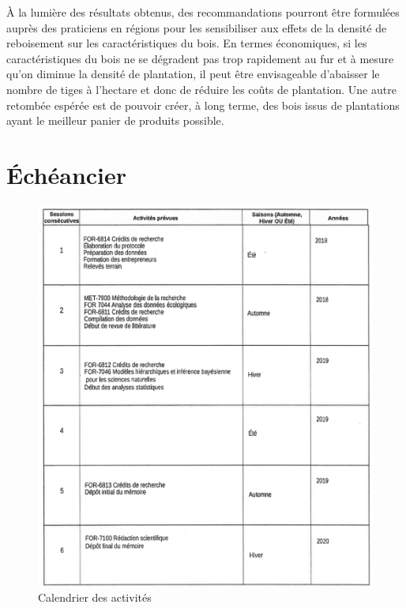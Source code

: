 \documentclass[letterpaper, 12pt]{article}
\begin{document}
\begin{onehalfspace}
À la lumière des résultats obtenus, des recommandations pourront être formulées auprès des praticiens en régions pour les sensibiliser aux effets de la densité de reboisement sur les caractéristiques du bois. En  termes  économiques,  si  les caractéristiques du bois ne se dégradent pas trop rapidement au fur et à mesure qu'on diminue la densité de plantation,  il peut être envisageable d'abaisser le nombre de tiges à l'hectare et donc de réduire les  coûts  de  plantation. Une autre retombée espérée est de pouvoir créer, à long terme, des bois issus de plantations ayant le meilleur panier de produits possible. 

\end{onehalfspace}

\section{Échéancier}

\begin{figure}[H]
	\centering
	\includegraphics[width=15cm]{Calendrier}
	\caption{Calendrier des activités}
\end{figure}


\newpage

\nocite{*}


\end{document}
